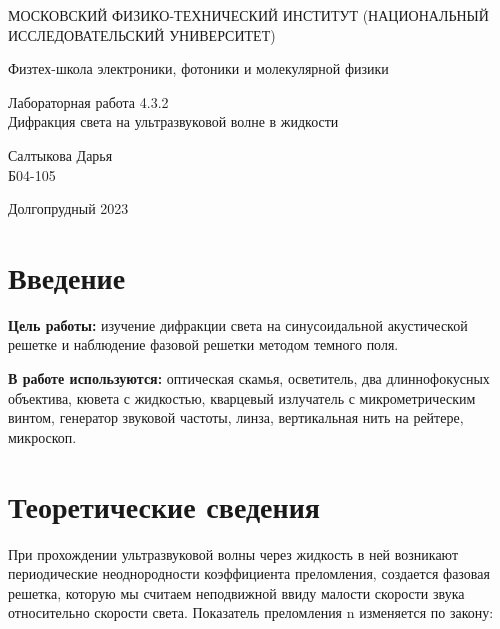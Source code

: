 \documentclass[a4paper,12pt]{article} %
\begin{document}
	
	\begin{titlepage}
	\begin{center}
		{\large МОСКОВСКИЙ ФИЗИКО-ТЕХНИЧЕСКИЙ ИНСТИТУТ (НАЦИОНАЛЬНЫЙ ИССЛЕДОВАТЕЛЬСКИЙ УНИВЕРСИТЕТ)}
	\end{center}
	\begin{center}
		{\large Физтех-школа электроники, фотоники и молекулярной физики}
	\end{center}
	
	
	\vspace{4.5cm}
	{\huge
		\begin{center}
			{Лабораторная работа 4.3.2}\\
			Дифракция света на ультразвуковой волне в жидкости
		\end{center}
	}
	\vspace{2cm}
	\begin{flushright}
		{\LARGE Салтыкова Дарья \\
			\vspace{0.5cm}
			Б04-105}
	\end{flushright}
	\vspace{8cm}
	\begin{center}
		Долгопрудный 2023
	\end{center}
\end{titlepage}

\section{Введение}

\noindent \textbf{Цель работы:} изучение дифракции света на синусоидальной акустической решетке и наблюдение фазовой решетки методом темного поля.

\medskip
	
\noindent \textbf{В работе используются:} оптическая скамья, осветитель, два длиннофокусных объектива, кювета с жидкостью, кварцевый излучатель с микрометрическим винтом, генератор звуковой частоты, линза, вертикальная нить на рейтере, микроскоп.
	

\section{Теоретические сведения}

\noindent При прохождении ультразвуковой волны через жидкость в ней возникают периодические неоднородности коэффициента преломления, создается фазовая решетка, которую мы считаем неподвижной ввиду малости скорости звука относительно скорости света. Показатель преломления n изменяется по закону:
	
\end{document}
